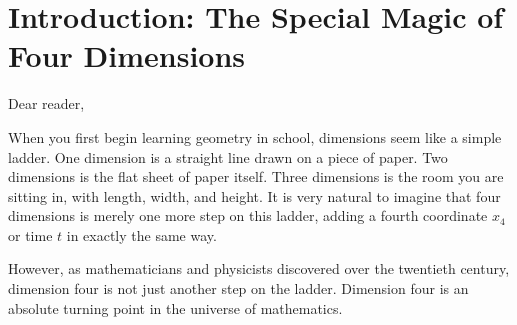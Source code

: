 \documentclass[11pt,a4paper]{article}
\begin{document}
\newpage
\tableofcontents
\newpage

\section{Introduction: The Special Magic of Four Dimensions}

Dear reader,

When you first begin learning geometry in school, dimensions seem like a simple ladder. One dimension is a straight line drawn on a piece of paper. Two dimensions is the flat sheet of paper itself. Three dimensions is the room you are sitting in, with length, width, and height. It is very natural to imagine that four dimensions is merely one more step on this ladder, adding a fourth coordinate $x_4$ or time $t$ in exactly the same way.

However, as mathematicians and physicists discovered over the twentieth century, dimension four is not just another step on the ladder. Dimension four is an absolute turning point in the universe of mathematics. 
\end{document}
